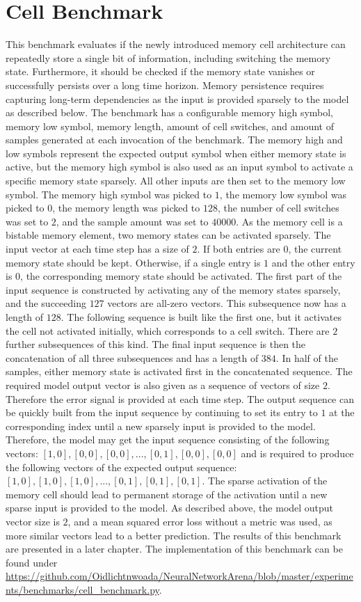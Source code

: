 \documentclass[draft,final]{vutinfth} %
\begin{document}
\section{Cell Benchmark} \label{cell}
This benchmark evaluates if the newly introduced memory cell architecture can repeatedly store a single bit of information, including switching the memory state.
Furthermore, it should be checked if the memory state vanishes or successfully persists over a long time horizon.
Memory persistence requires capturing long-term dependencies as the input is provided sparsely to the model as described below.
The benchmark has a configurable memory high symbol, memory low symbol, memory length, amount of cell switches, and amount of samples generated at each invocation of the benchmark.
The memory high and low symbols represent the expected output symbol when either memory state is active, but the memory high symbol is also used as an input symbol to activate a specific memory state sparsely. All other inputs are then set to the memory low symbol.
The memory high symbol was picked to $1$, the memory low symbol was picked to $0$, the memory length was picked to $128$, the number of cell switches was set to $2$, and the sample amount was set to $40000$.
As the memory cell is a bistable memory element, two memory states can be activated sparsely.
The input vector at each time step has a size of $2$. If both entries are $0$, the current memory state should be kept.
Otherwise, if a single entry is $1$ and the other entry is $0$, the corresponding memory state should be activated.
The first part of the input sequence is constructed by activating any of the memory states sparsely, and the succeeding $127$ vectors are all-zero vectors.
This subsequence now has a length of $128$. The following sequence is built like the first one, but it activates the cell not activated initially, which corresponds to a cell switch.
There are $2$ further subsequences of this kind. The final input sequence is then the concatenation of all three subsequences and has a length of $384$.
In half of the samples, either memory state is activated first in the concatenated sequence.
The required model output vector is also given as a sequence of vectors of size $2$. Therefore the error signal is provided at each time step.
The output sequence can be quickly built from the input sequence by continuing to set its entry to $1$ at the corresponding index until a new sparsely input is provided to the model.
Therefore, the model may get the input sequence consisting of the following vectors: $[1,0],[0,0],[0,0],...,[0,1],[0,0],[0,0]$ and is required to produce the following vectors of the expected output sequence: $[1,0],[1,0],[1,0],...,[0,1],[0,1],[0,1]$.
The sparse activation of the memory cell should lead to permanent storage of the activation until a new sparse input is provided to the model.
As described above, the model output vector size is $2$, and a mean squared error loss without a metric was used, as more similar vectors lead to a better prediction.
The results of this benchmark are presented in a later chapter.
The implementation of this benchmark can be found under \url{https://github.com/Oidlichtnwoada/NeuralNetworkArena/blob/master/experiments/benchmarks/cell_benchmark.py}.
\end{document}
